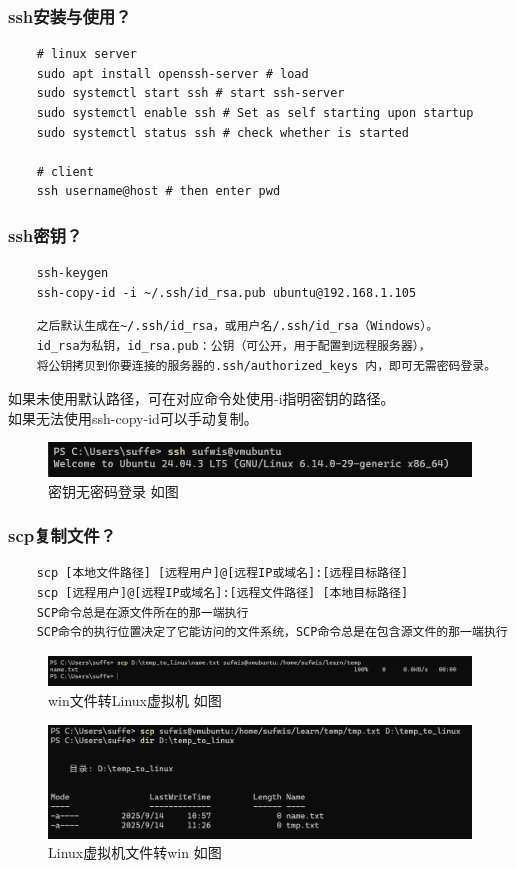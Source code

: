 \documentclass[UTF8]{ctexart}
\begin{document}
\subsubsection{ssh安装与使用？}
\begin{lstlisting}
	# linux server
	sudo apt install openssh-server # load
	sudo systemctl start ssh # start ssh-server
	sudo systemctl enable ssh # Set as self starting upon startup
	sudo systemctl status ssh # check whether is started

	# client
	ssh username@host # then enter pwd
\end{lstlisting}

\subsubsection{ssh密钥？}
\begin{lstlisting}
	ssh-keygen
	ssh-copy-id -i ~/.ssh/id_rsa.pub ubuntu@192.168.1.105
\end{lstlisting}
\begin{verbatim}
	之后默认生成在~/.ssh/id_rsa，或用户名/.ssh/id_rsa（Windows）。
	id_rsa为私钥，id_rsa.pub：公钥（可公开，用于配置到远程服务器），
	将公钥拷贝到你要连接的服务器的.ssh/authorized_keys 内，即可无需密码登录。
\end{verbatim}
\qquad 如果未使用默认路径，可在对应命令处使用-i指明密钥的路径。
\\
\indent 如果无法使用ssh-copy-id可以手动复制。
\begin{figure}[H]
	\centering
	\includegraphics[width=0.7\linewidth]{figure/ssh.png}
	\caption{密钥无密码登录 如图}
\end{figure}

\subsubsection{scp复制文件？}
\begin{verbatim}
	scp [本地文件路径] [远程用户]@[远程IP或域名]:[远程目标路径]
	scp [远程用户]@[远程IP或域名]:[远程文件路径] [本地目标路径]
	SCP命令总是在源文件所在的那一端执行
	SCP命令的执行位置决定了它能访问的文件系统，SCP命令总是在包含源文件的那一端执行
\end{verbatim}
\begin{figure}[H]
	\centering
	\includegraphics[width=0.7\linewidth]{figure/win_to_linux.png}
	\caption{win文件转Linux虚拟机 如图}
\end{figure}
\begin{figure}[H]
	\centering
	\includegraphics[width=0.7\linewidth]{figure/linux_to_win.png}
	\caption{Linux虚拟机文件转win 如图}
\end{figure}
\end{document}
